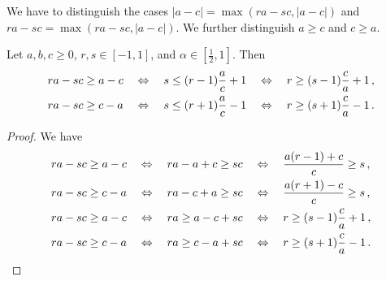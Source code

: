 We have to distinguish the cases $|a-c|=\max(ra - sc, |a-c|)$ and $ra - sc=\max(ra - sc, |a-c|)$. We further distinguish $a\geq c$ and $c \geq a$.
%
\begin{lemma}[$ra - sc$ vs $|a-c|$]\label{lmm:srbound}
	Let $a,b,c\geq0$, $r,s\in[-1,1]$, and $\alpha\in[\frac12, 1]$.
	Then
	\begin{align*}
		&ra - sc \geq a-c
		\quad\Leftrightarrow\quad 
		s 
		\leq
		(r-1) \frac ac+1
		\quad\Leftrightarrow\quad 
		r \geq 
		(s-1)\frac ca +1
		\, ,
\\
		&ra - sc \geq c-a
		\quad\Leftrightarrow\quad 
		s 
		\leq
		(r+1) \frac ac -1
		\quad\Leftrightarrow\quad 
		r \geq 
		(s+1)\frac ca -1
		\, .
	\end{align*}
\end{lemma}
\begin{proof}
We have
	\begin{align*}
	&
		ra - sc \geq a-c
		\quad\Leftrightarrow\quad
		ra - a+c \geq sc
		\quad\Leftrightarrow\quad
		\frac{a(r-1)+c}{c} \geq s
\, ,\\&
		ra - sc \geq c-a
		\quad\Leftrightarrow\quad
		ra - c+a \geq sc
		\quad\Leftrightarrow\quad
		\frac{a(r+1)-c}{c} \geq s
\, ,\\&
		ra - sc \geq a-c
	\quad	\Leftrightarrow\quad
		ra \geq a-c+sc
		\quad\Leftrightarrow\quad
		r \geq (s-1)\frac ca +1
\, ,\\&
		ra - sc \geq c-a
		\quad\Leftrightarrow\quad
		ra  \geq c-a+sc
		\quad\Leftrightarrow\quad
		r \geq (s+1)\frac ca -1
\, .
	\end{align*}
\end{proof}
%
%
%
%
